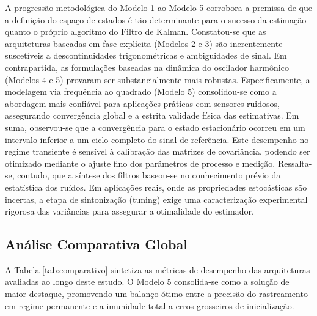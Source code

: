 \documentclass[a4paper,12pt]{article}
\begin{document}
A progressão metodológica do Modelo 1 ao Modelo 5 corrobora a premissa de que a definição do espaço de estados é tão determinante para o sucesso da estimação quanto o próprio algoritmo do Filtro de Kalman. Constatou-se que as arquiteturas baseadas em fase explícita (Modelos 2 e 3) são inerentemente suscetíveis a descontinuidades trigonométricas e ambiguidades de sinal. Em contrapartida, as formulações baseadas na dinâmica do oscilador harmônico (Modelos 4 e 5) provaram ser substancialmente mais robustas. Especificamente, a modelagem via frequência ao quadrado (Modelo 5) consolidou-se como a abordagem mais confiável para aplicações práticas com sensores ruidosos, assegurando convergência global e a estrita validade física das estimativas. Em suma, observou-se que a convergência para o estado estacionário ocorreu em um intervalo inferior a um ciclo completo do sinal de referência. Este desempenho no regime transiente é sensível à calibração das matrizes de covariância, podendo ser otimizado mediante o ajuste fino dos parâmetros de processo e medição. Ressalta-se, contudo, que a síntese dos filtros baseou-se no conhecimento prévio da estatística dos ruídos. Em aplicações reais, onde as propriedades estocásticas são incertas, a etapa de sintonização (tuning) exige uma caracterização experimental rigorosa das variâncias para assegurar a otimalidade do estimador.

\subsection{Análise Comparativa Global}
\label{subsec:analise_comparativa}

A Tabela \ref{tab:comparativo} sintetiza as métricas de desempenho das arquiteturas avaliadas ao longo deste estudo. O Modelo 5 consolida-se como a solução de maior destaque, promovendo um balanço ótimo entre a precisão do rastreamento em regime permanente e a imunidade total a erros grosseiros de inicialização.
\end{document}

